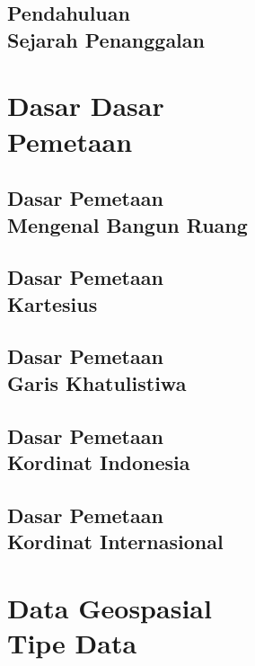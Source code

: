 \documentclass{WileySix}
\begin{document}
\chapter[Sejarah Penanggalan]
{Pendahuluan\\ Sejarah  Penanggalan}


\part[Dasar Pemetaan]
{Dasar Dasar\\ Pemetaan}

\chapter[Mengenal Bangun Ruang]
{Dasar Pemetaan\\ Mengenal Bangun Ruang}


\chapter[Mengenal Diagram Kartesius]
{Dasar Pemetaan\\ Kartesius}


\chapter[Garis Khatulistiwa]
{Dasar Pemetaan\\ Garis Khatulistiwa}


\chapter[Kordinat Indonesia]
{Dasar Pemetaan\\ Kordinat Indonesia}


\chapter[Kordinat Internasional]
{Dasar Pemetaan\\ Kordinat Internasional}



\part[Data Geospasial]
{Data Geospasial\\ Tipe Data}
\end{document}
